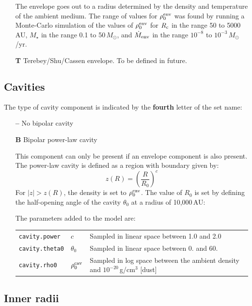 \documentclass[10pt]{article}
\newcommand{\mdote}{\dot{M}_{\rm env}}
\newcommand{\mstar}{M_\star}
\newcommand{\msun}{M_\odot}
\newcommand{\rc}{R_{\rm c}}
\begin{document}
\begin{itemize}
The envelope goes out to a radius determined by the density and temperature of the ambient medium. The range of values for 
$\rho_0^{\rm env}$ was found by running a Monte-Carlo simulation of the values of $\rho_0^{\rm env}$ for $\rc$ in the range 50 to 5000\,AU, $\mstar$ in the range 0.1 to 50\,$\msun$, and $\mdote$ in the range $10^{-8}$ to $10^{-3}$\,$\msun$/yr.

\item[\textbf{T}] Terebey/Shu/Cassen envelope. To be defined in future.

\end{itemize}

\subsection{Cavities}

The type of cavity component is indicated by the \textbf{fourth} letter of the set name:

\begin{itemize}

\item[\textbf{--}] No bipolar cavity
\item[\textbf{B}] Bipolar power-law cavity

This component can only be present if an envelope component is also present. The power-law cavity is defined as a region with boundary given by:
$$
z(R) = \left(\frac{R}{R_0}\right)^c
$$
For $|z| > z(R)$, the density is set to $\rho_0^{\rm cav}$. The value of $R_0$ is set by defining the half-opening angle of the cavity $\theta_0$ at a radius of 10,000\,AU:

The parameters added to the model are:

\begin{center}
  \begin{tabular}{llp{4in}}
    \texttt{cavity.power} & $c$ & Sampled in linear space between 1.0 and 2.0 \\
    \texttt{cavity.theta0} & $\theta_0$ & Sampled in linear space between 0. and 60. \\
    \texttt{cavity.rho0} & $\rho_0^{\rm cav} $ & Sampled in log space between the ambient density and $10^{-20}$\,g/cm$^3$ [dust]\\
  \end{tabular}
\end{center}

\end{itemize}

\subsection{Inner radii}
\end{document}
